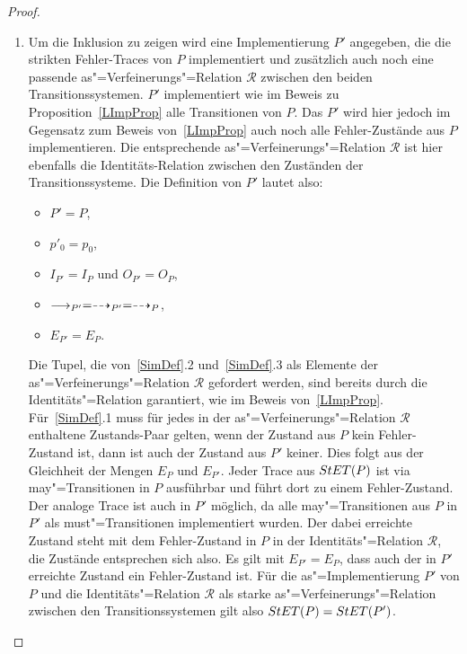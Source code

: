 \begin{proof}\mbox{}
  \begin{enumerate}
    \item Um die Inklusion zu zeigen wird eine Implementierung $P'$ angegeben,
      die die strikten Fehler-Traces von $P$ implementiert und zusätzlich auch
      noch eine passende as"=Verfeinerungs"=Relation $\mathcal{R}$ zwischen den
      beiden Transitionssystemen. $P'$ implementiert wie im Beweis zu
      Proposition~\ref{LImpProp} alle Transitionen von $P$. Das $P'$ wird hier
      jedoch im Gegensatz zum Beweis von~\ref{LImpProp} auch noch alle
      Fehler-Zustände aus $P$ implementieren. Die entsprechende
      as"=Verfeinerungs"=Relation $\mathcal{R}$ ist hier ebenfalls die
      Identitäts-Relation zwischen den Zuständen der Transitionssysteme. Die
      Definition von $P'$ lautet also:
      \begin{itemize}
        \item $P'=P$,
        \item $p'_0=p_0$,
        \item $I_{P'}=I_P$ und $O_{P'}=O_P$,
        \item $\must _{P'} =\may _{P'} = \may _P$,
        \item $E_{P'}=E_P$.
      \end{itemize}
      Die Tupel, die von~\ref{SimDef}.2 und~\ref{SimDef}.3 als Elemente der
      as"=Verfeinerungs"=Relation $\mathcal{R}$ gefordert werden, sind bereits
      durch die Identitäts"=Relation garantiert, wie im Beweis
      von~\ref{LImpProp}. Für~\ref{SimDef}.1 muss für jedes in der
      as"=Verfeinerungs"=Relation $\mathcal{R}$ enthaltene Zustands-Paar
      gelten, wenn der Zustand aus $P$ kein Fehler-Zustand ist, dann ist auch
      der Zustand aus $P'$ keiner. Dies folgt aus der Gleichheit der Mengen
      $E_P$ und $E_{P'}$. Jeder Trace aus $StET (P)$ ist via may"=Transitionen
      in $P$ ausführbar und führt dort zu einem Fehler-Zustand. Der analoge
      Trace ist auch in $P'$ möglich, da alle may"=Transitionen aus $P$ in $P'$
      als must"=Transitionen implementiert wurden. Der dabei erreichte Zustand
      steht mit dem Fehler-Zustand in $P$ in der Identitäts"=Relation
      $\mathcal{R}$, die Zustände entsprechen sich also. Es gilt mit
      $E_{P'}=E_P$, dass auch der in $P'$ erreichte Zustand ein Fehler-Zustand
      ist. Für die as"=Implementierung $P'$ von $P$ und die
      Identitäts"=Relation $\mathcal{R}$ als starke as"=Verfeinerungs"=Relation
      zwischen den Transitionssystemen gilt also $StET (P) =StET (P')$.

\end{enumerate}
\end{proof}

